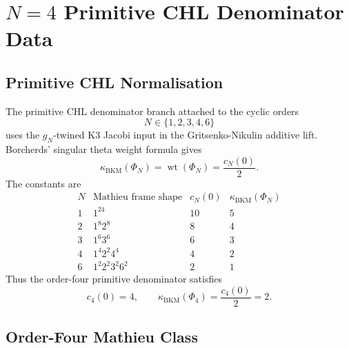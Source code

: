 \providecommand{\kBKM}{\kappa_{\mathrm{BKM}}}
\providecommand{\kch}{\kappa_{\mathrm{ch}}}
\providecommand{\kcat}{\kappa_{\mathrm{cat}}}
\providecommand{\kfib}{\kappa_{\mathrm{fiber}}}
\providecommand{\kHeis}{\kappa_{\mathrm{ch}}^{\mathrm{Heis}}}
\providecommand{\Z}{\mathbb{Z}}
\providecommand{\C}{\mathbb{C}}

\section*{\texorpdfstring{$N=4$}{N=4} Primitive CHL Denominator Data}
\label{wn:sec:N4-primitive-chl-data}

\subsection*{Primitive CHL Normalisation}

The primitive CHL denominator branch attached to the cyclic orders
\[
  N \in \{1,2,3,4,6\}
\]
uses the \(g_N\)-twined K3 Jacobi input in the
Gritsenko-Nikulin additive lift.  Borcherds' singular theta weight
formula gives
\[
  \kBKM(\Phi_N)
  =
  \operatorname{wt}(\Phi_N)
  =
  \frac{c_N(0)}{2}.
\]
The constants are
\[
\begin{array}{c|c|c|c}
N & \text{Mathieu frame shape} & c_N(0) & \kBKM(\Phi_N)\\
\hline
1 & 1^{24} & 10 & 5\\
2 & 1^8 2^8 & 8 & 4\\
3 & 1^6 3^6 & 6 & 3\\
4 & 1^4 2^2 4^4 & 4 & 2\\
6 & 1^2 2^2 3^2 6^2 & 2 & 1
\end{array}
\]
Thus the order-four primitive denominator satisfies
\[
  c_4(0)=4,\qquad
  \kBKM(\Phi_4)=\frac{c_4(0)}{2}=2.
\]

\subsection*{Order-Four Mathieu Class}

